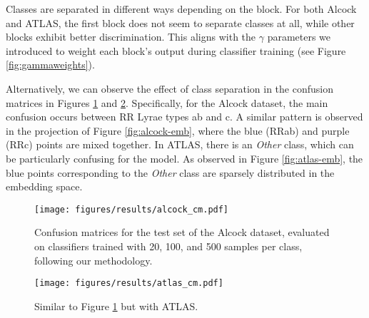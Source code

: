 Classes are separated in different ways depending on the block. For both Alcock and ATLAS, the first block does not seem to separate classes at all, while other blocks exhibit better discrimination. This aligns with the $\gamma$ parameters we introduced to weight each block's output during classifier training (see Figure \ref{fig:gammaweights}).

Alternatively, we can observe the effect of class separation in the confusion matrices in Figures \ref{fig:cm_alcock} and \ref{fig:cm_atlas}. Specifically, for the Alcock dataset, the main confusion occurs between RR Lyrae types ab and c. A similar pattern is observed in the projection of Figure \ref{fig:alcock-emb}, where the blue (RRab) and purple (RRc) points are mixed together. In ATLAS, there is an \textit{Other} class, which can be particularly confusing for the model. As observed in Figure \ref{fig:atlas-emb}, the blue points corresponding to the \textit{Other} class are sparsely distributed in the embedding space.
\begin{figure}
    \centering
    \texttt{[image: figures/results/alcock\_cm.pdf]}
    \caption{Confusion matrices for the test set of the Alcock dataset, evaluated on classifiers trained with 20, 100, and 500 samples per class, following our methodology. }
    \label{fig:cm_alcock}
\end{figure}
 \begin{figure}
    \centering
    \texttt{[image: figures/results/atlas\_cm.pdf]}
    \caption{Similar to Figure \ref{fig:cm_alcock} but with ATLAS.}
    \label{fig:cm_atlas}
\end{figure}



